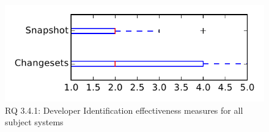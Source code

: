 
\begin{figure}
\centering
\includegraphics[height=0.4\textheight]{figures/dit_seed/rq1_tiny}
\caption{RQ 3.4.1: Developer Identification effectiveness measures for all subject systems}
\label{fig:dit_seed:rq1:tiny}
\end{figure}
